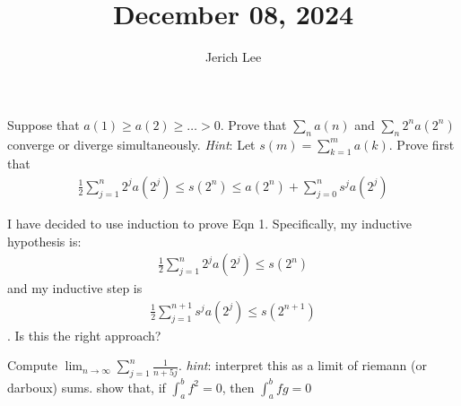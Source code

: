 \documentclass[12pt]{article}
\title{December 08, 2024}
\author{Jerich Lee}
\date{}
\theoremstyle{definition} %
\theoremstyle{plain} %
\begin{document}
\maketitle
Suppose that $a(1)\geq a(2)\geq \ldots > 0 $. Prove that $\sum_{n}a(n) $ and $\sum_{n} 2^{n}a(2^{n}) $ converge or diverge simultaneously. \emph{Hint}: Let $s(m)=\sum_{k=1}^{m} a(k)$. Prove first that 
\begin{align}
    \frac{1}{2}\sum_{j=1}^{n} 2^{j}a(2^{j})\leq s(2^{n})\leq a(2^{n})+\sum_{j=0}^{n} s^{j}a(2^{j}) \label{eqn1}
\end{align}

I have decided to use induction to prove Eqn 1. Specifically, my inductive hypothesis is:
\begin{align}
    \frac{1}{2}\sum_{j=1}^{n} 2^{j}a(2^{j})\leq s(2^{n})
\end{align}
and my inductive step is 
\begin{align}
    \frac{1}{2}\sum_{j=1}^{n+1} s^{j}a(2^{j})\leq s(2^{n+1})
\end{align}. Is this the right approach?

Compute $\lim_{n \to \infty} \sum_{j=1}^{n} \frac{1}{n+5j}$. \emph{hint}: interpret this as a limit of riemann (or darboux) sums. 
show that, if $\int_{a}^{b} f^{2}  =0$, then $\int_{a}^{b} fg=0  $  
\end{document}
